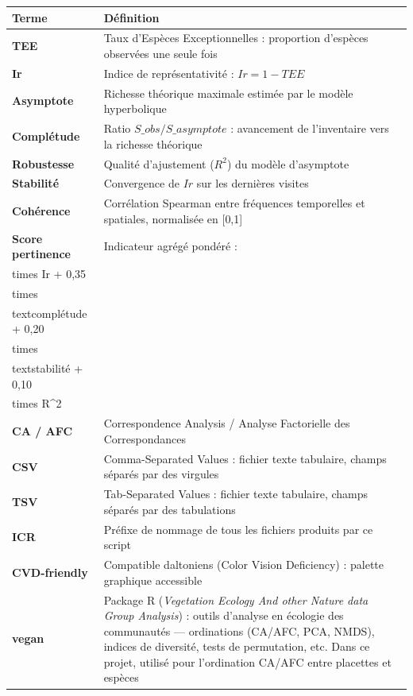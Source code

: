 {\def\LTcaptype{none} %
\begin{longtable}[]{@{}
  >{\raggedright\arraybackslash}p{}
  >{\raggedright\arraybackslash}p{}@{}}
\toprule\noalign{}
\begin{minipage}[b]{\linewidth}\raggedright
Terme
\end{minipage} & \begin{minipage}[b]{\linewidth}\raggedright
Définition
\end{minipage} \\
\midrule\noalign{}
\endhead
\bottomrule\noalign{}
\endlastfoot
\textbf{TEE} & Taux d'Espèces Exceptionnelles : proportion d'espèces
observées une seule fois \\
\textbf{Ir} & Indice de représentativité : \(Ir = 1 - TEE\) \\
\textbf{Asymptote} & Richesse théorique maximale estimée par le modèle
hyperbolique \\
\textbf{Complétude} & Ratio \(S\_{obs} / S\_{asymptote}\) : avancement
de l'inventaire vers la richesse théorique \\
\textbf{Robustesse} & Qualité d'ajustement (\(R^2\)) du modèle
d'asymptote \\
\textbf{Stabilité} & Convergence de \(Ir\) sur les dernières visites \\
\textbf{Cohérence} & Corrélation Spearman entre fréquences temporelles
et spatiales, normalisée en {[}0,1{]} \\
\textbf{Score pertinence} & Indicateur agrégé pondéré :
\(0{,}35 \\times Ir + 0{,}35 \\times \\text{complétude} + 0{,}20 \\times \\text{stabilité} + 0{,}10 \\times R^2\) \\
\textbf{CA / AFC} & Correspondence Analysis / Analyse Factorielle des
Correspondances \\
\textbf{CSV} & Comma-Separated Values : fichier texte tabulaire, champs
séparés par des virgules \\
\textbf{TSV} & Tab-Separated Values : fichier texte tabulaire, champs
séparés par des tabulations \\
\textbf{ICR} & Préfixe de nommage de tous les fichiers produits par ce
script \\
\textbf{CVD-friendly} & Compatible daltoniens (Color Vision Deficiency)
: palette graphique accessible \\
\textbf{vegan} & Package R (\emph{Vegetation Ecology And other Nature
data Group Analysis}) : outils d'analyse en écologie des communautés ---
ordinations (CA/AFC, PCA, NMDS), indices de diversité, tests de
permutation, etc. Dans ce projet, utilisé pour l'ordination CA/AFC entre
placettes et espèces \\
\end{longtable}
}

